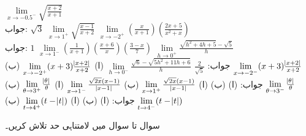 $\lim\limits_{x\to -0.5^-}\sqrt{\tfrac{x+2}{x+1}}$\\
جواب:\quad
$\sqrt{3}$
$\lim\limits_{x\to 1^+}\sqrt{\tfrac{x-1}{x+2}}$
$\lim\limits_{x\to -2^+}(\tfrac{x}{x+1})(\tfrac{2x+5}{x^2+x})$\\
جواب:\quad
$1$
$\lim\limits_{x\to 1^-}(\tfrac{1}{x+1})(\tfrac{x+6}{x})(\tfrac{3-x}{7})$
$\lim\limits_{h\to 0^+}\tfrac{\sqrt{h^2+4h+5}-\sqrt{5}}{h}$\\
جواب:\quad
$\tfrac{2}{\sqrt{5}}$
$\lim\limits_{h\to 0^-}\tfrac{\sqrt{6}-\sqrt{5h^2+11h+6}}{h}$
(ا)\quad
$\lim\limits_{x\to -2^+}(x+3)\tfrac{\abs{x+2}}{x+2}$\quad
(ب)\quad
$\lim\limits_{x\to -2^-}(x+3)\tfrac{\abs{x+2}}{x+2}$\\
جواب:\quad
(ا)  (ب) 
(ا)\quad
$\lim\limits_{x\to 1^+}\tfrac{\sqrt{2x}(x-1)}{\abs{x-1}}$\quad
(ب)\quad
$\lim\limits_{x\to 1^-}\tfrac{\sqrt{2x}(x-1)}{\abs{x-1}}$
(ا)\quad
$\lim\limits_{\theta\to 3^+}\tfrac{\abs{\theta}}{\theta}$\quad
(ب)\quad
$\lim\limits_{\theta\to 3^-}\tfrac{\abs{\theta}}{\theta}$\\
جواب:\quad
(ا)  (ب) 
(ا)\quad
$\lim\limits_{t\to 4^+} (t-\abs{t})$\quad
(ب)\quad
$\lim\limits_{t\to 4^-} (t-\abs{t})$

 سوال  تا سوال  میں لامتناہی حد تلاش کریں۔

